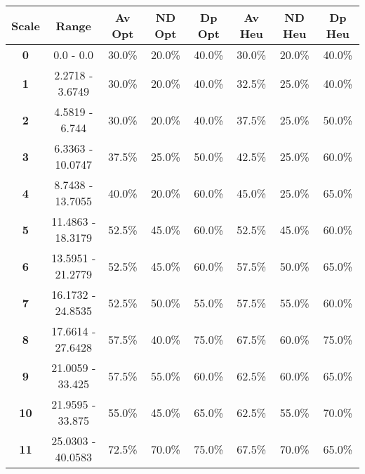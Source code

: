 \begin{tabular}{ | c || c | c | c | c | c | c | c | }
\hline
{\bf Scale} & {\bf Range} & {\bf Av Opt} & {\bf ND Opt} & {\bf Dp Opt} & {\bf Av Heu} & {\bf ND Heu} & {\bf Dp Heu}
\\
\hline
\hline
{\bf 0} & 0.0 - 0.0 & 30.0\% & 20.0\% & 40.0\% & 30.0\% & 20.0\% & 40.0\% \\ \hline
{\bf 1} & 2.2718 - 3.6749 & 30.0\% & 20.0\% & 40.0\% & 32.5\% & 25.0\% & 40.0\% \\ \hline
{\bf 2} & 4.5819 - 6.744 & 30.0\% & 20.0\% & 40.0\% & 37.5\% & 25.0\% & 50.0\% \\ \hline
{\bf 3} & 6.3363 - 10.0747 & 37.5\% & 25.0\% & 50.0\% & 42.5\% & 25.0\% & 60.0\% \\ \hline
{\bf 4} & 8.7438 - 13.7055 & 40.0\% & 20.0\% & 60.0\% & 45.0\% & 25.0\% & 65.0\% \\ \hline
{\bf 5} & 11.4863 - 18.3179 & 52.5\% & 45.0\% & 60.0\% & 52.5\% & 45.0\% & 60.0\% \\ \hline
{\bf 6} & 13.5951 - 21.2779 & 52.5\% & 45.0\% & 60.0\% & 57.5\% & 50.0\% & 65.0\% \\ \hline
{\bf 7} & 16.1732 - 24.8535 & 52.5\% & 50.0\% & 55.0\% & 57.5\% & 55.0\% & 60.0\% \\ \hline
{\bf 8} & 17.6614 - 27.6428 & 57.5\% & 40.0\% & 75.0\% & 67.5\% & 60.0\% & 75.0\% \\ \hline
{\bf 9} & 21.0059 - 33.425 & 57.5\% & 55.0\% & 60.0\% & 62.5\% & 60.0\% & 65.0\% \\ \hline
{\bf 10} & 21.9595 - 33.875 & 55.0\% & 45.0\% & 65.0\% & 62.5\% & 55.0\% & 70.0\% \\ \hline
{\bf 11} & 25.0303 - 40.0583 & 72.5\% & 70.0\% & 75.0\% & 67.5\% & 70.0\% & 65.0\% \\ \hline
\end{tabular}